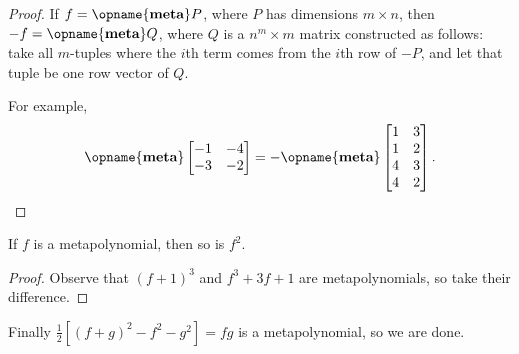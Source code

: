\begin{proof}
    If $f=\opname{\textbf{meta}}P$, where $P$ has dimensions $m\times n$, then $-f=\opname{\textbf{meta}}Q$, where $Q$ is a $n^m\times m$ matrix constructed as follows: take all $m$-tuples where the $i$th term comes from the $i$th row of $-P$, and let that tuple be one row vector of $Q$.

    For example, \[\opname{\textbf{meta}}\begin{bmatrix}-1&-4\\-3&-2\end{bmatrix}=-\opname{\textbf{meta}}\begin{bmatrix}1&3\\1&2\\4&3\\4&2\end{bmatrix}.\]
\end{proof}
\begin{lemma}
    If $f$ is a metapolynomial, then so is $f^2$.
\end{lemma}
\begin{proof}
    Observe that $(f+1)^3$ and $f^3+3f+1$ are metapolynomials, so take their difference.
\end{proof}

Finally $\frac12\left[(f+g)^2-f^2-g^2\right]=fg$ is a metapolynomial, so we are done.

